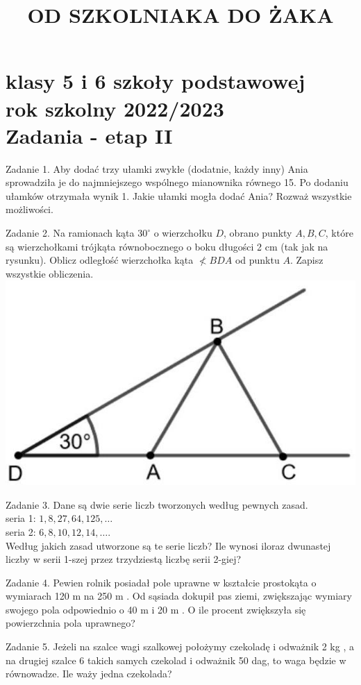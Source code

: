 \documentclass[10pt]{article}
\title{OD SZKOLNIAKA DO ŻAKA }
\author{}
\date{}
\begin{document}
\maketitle
\section*{klasy 5 i 6 szkoły podstawowej \\
 rok szkolny 2022/2023 \\
 Zadania - etap II}
Zadanie 1. Aby dodać trzy ułamki zwykłe (dodatnie, każdy inny) Ania sprowadziła je do najmniejszego wspólnego mianownika równego 15. Po dodaniu ułamków otrzymała wynik 1. Jakie ułamki mogła dodać Ania? Rozważ wszystkie możliwości.

Zadanie 2. Na ramionach kąta \(30^{\circ}\) o wierzchołku \(D\), obrano punkty \(A, B, C\), które są wierzchołkami trójkąta równobocznego o boku długości 2 cm (tak jak na rysunku). Oblicz odległość wierzchołka kąta \(\nless B D A\) od punktu \(A\). Zapisz wszystkie obliczenia.\\
\includegraphics[max width=\textwidth, center]{2024_11_21_2db47e70611255ec3156g-1}

Zadanie 3. Dane są dwie serie liczb tworzonych według pewnych zasad.\\
seria 1: \(1,8,27,64,125, \ldots\)\\
seria 2: \(6,8,10,12,14, \ldots\).\\
Według jakich zasad utworzone są te serie liczb? Ile wynosi iloraz dwunastej liczby w serii 1-szej przez trzydziestą liczbę serii 2-giej?

Zadanie 4. Pewien rolnik posiadał pole uprawne w kształcie prostokąta o wymiarach 120 m na 250 m . Od sąsiada dokupił pas ziemi, zwiększając wymiary swojego pola odpowiednio o 40 m i 20 m . O ile procent zwiększyła się powierzchnia pola uprawnego?

Zadanie 5. Jeżeli na szalce wagi szalkowej położymy czekoladę i odważnik 2 kg , a na drugiej szalce 6 takich samych czekolad i odważnik 50 dag, to waga będzie w równowadze. Ile waży jedna czekolada?
\end{document}
